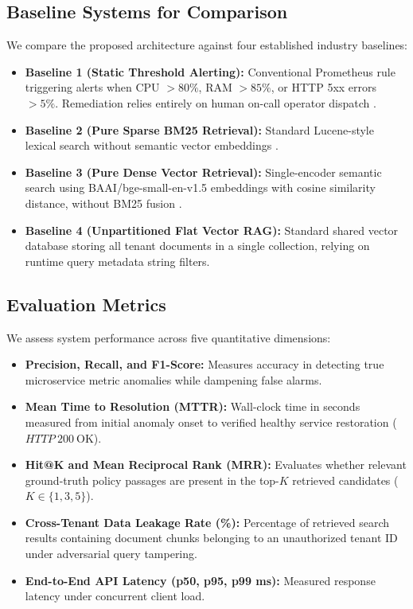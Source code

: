 \documentclass[12pt,onecolumn,draftclsnofoot]{IEEEtran}
\begin{document}
\subsection{Baseline Systems for Comparison}
We compare the proposed architecture against four established industry baselines:
\begin{itemize}
    \item \textbf{Baseline 1 (Static Threshold Alerting):} Conventional Prometheus rule triggering alerts when CPU $>80\%$, RAM $>85\%$, or HTTP 5xx errors $>5\%$. Remediation relies entirely on human on-call operator dispatch \cite{beyer2016site}.
    \item \textbf{Baseline 2 (Pure Sparse BM25 Retrieval):} Standard Lucene-style lexical search without semantic vector embeddings \cite{robertson2009probabilistic}.
    \item \textbf{Baseline 3 (Pure Dense Vector Retrieval):} Single-encoder semantic search using BAAI/bge-small-en-v1.5 embeddings with cosine similarity distance, without BM25 fusion \cite{lewis2020retrieval}.
    \item \textbf{Baseline 4 (Unpartitioned Flat Vector RAG):} Standard shared vector database storing all tenant documents in a single collection, relying on runtime query metadata string filters.
\end{itemize}

\subsection{Evaluation Metrics}
We assess system performance across five quantitative dimensions:
\begin{itemize}
    \item \textbf{Precision, Recall, and F1-Score:} Measures accuracy in detecting true microservice metric anomalies while dampening false alarms.
    \item \textbf{Mean Time to Resolution (MTTR):} Wall-clock time in seconds measured from initial anomaly onset to verified healthy service restoration ($HTTP\ 200\ \text{OK}$).
    \item \textbf{Hit@K and Mean Reciprocal Rank (MRR):} Evaluates whether relevant ground-truth policy passages are present in the top-$K$ retrieved candidates ($K \in \{1, 3, 5\}$).
    \item \textbf{Cross-Tenant Data Leakage Rate (\%):} Percentage of retrieved search results containing document chunks belonging to an unauthorized tenant ID under adversarial query tampering.
    \item \textbf{End-to-End API Latency (p50, p95, p99 ms):} Measured response latency under concurrent client load.
\end{itemize}
\end{document}
